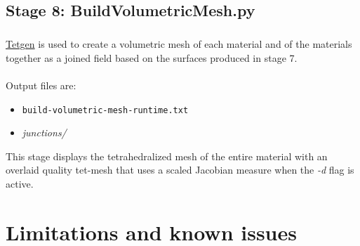 \documentclass[fleqn,12pt,openany]{book}
\begin{document}
\section{Stage 8: BuildVolumetricMesh.py}

\paragraph{}
\href{http://tetgen.berlios.de}{Tetgen} is used to create a volumetric mesh of each material and of the materials 
together as a joined field based on the surfaces produced in stage 7. \\ \\

Output files are:
\begin{itemize}

\item{\verb+build-volumetric-mesh-runtime.txt+}
\item{\emph{junctions/}}

\end{itemize}

This stage displays the tetrahedralized mesh of the entire material with an 
overlaid quality tet-mesh that uses a scaled Jacobian measure when the 
\emph{-d} flag is active.


\chapter{Limitations and known issues}
\label{chapter:limitations}
\end{document}
